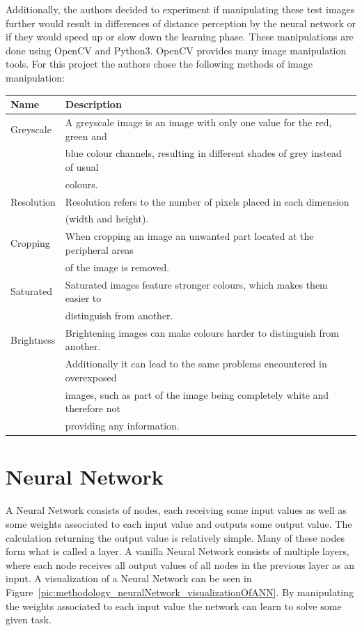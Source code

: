 Additionally, the authors decided to experiment if manipulating these test images further would result in differences of distance perception by the neural network or if they would speed up or slow down the learning phase. These manipulations are done using OpenCV and Python3. OpenCV provides many image manipulation tools. For this project the authors chose the following methods of image manipulation:

\begin{table}[h!]
	\begin{tabular}{|l|l|}
		\hline
		\bfseries Name & \bfseries Description \\
		\hline
		Greyscale & A greyscale image is an image with only one value for the red, green and \\
		& blue colour channels, resulting in different shades of grey instead of usual \\
		& colours. \\
		\hline
		Resolution & Resolution refers to the number of pixels placed in each dimension \\
		& (width and height). \\
		\hline
		Cropping & When cropping an image an unwanted part located at the peripheral areas \\
		& of the image is removed. \\
		\hline
		Saturated & Saturated images feature stronger colours, which makes them easier to \\
		& distinguish from another. \\
		\hline
		Brightness & Brightening images can make colours harder to distinguish from another. \\
		& Additionally it can lead to the same problems encountered in overexposed \\
		& images, such as part of the image being completely white and therefore not \\
		& providing any information. \\
		\hline
	\end{tabular}
\end{table}


\section{Neural Network}
A Neural Network consists of nodes, each receiving some input values as well as some weights associated to each input value and outputs some output value. The calculation returning the output value is relatively simple. Many of these nodes form what is called a layer. A vanilla Neural Network consists of multiple layers, where each node receives all output values of all nodes in the previous layer as an input. A visualization of a Neural Network can be seen in Figure~\ref{pic:methodology_neuralNetwork_visualizationOfANN}. By manipulating the weights associated to each input value the network can learn to solve some given task.

